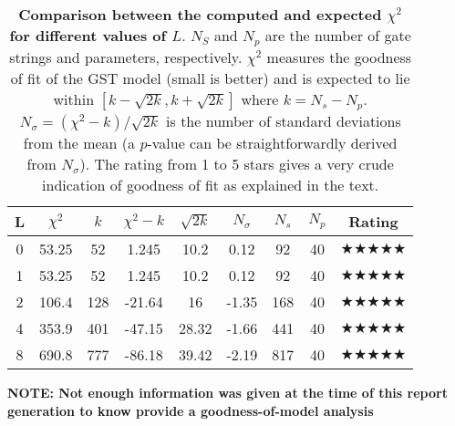 \documentclass{article}[11pt]
\begin{document}
\begin{table}[h]
\begin{center}
\begin{tabular}[l]{|c|c|c|c|c|c|c|c|c|}
\hline
L & $\chi^2$ & $k$ & $\chi^2-k$ & $\sqrt{2k}$ & $N_\sigma$ & $N_s$ & $N_p$ & Rating \\ \hline
0 & 53.25 & 52 & 1.245 & 10.2 & 0.12 & 92 & 40 & $\bigstar\bigstar\bigstar\bigstar\bigstar$ \\ \hline
1 & 53.25 & 52 & 1.245 & 10.2 & 0.12 & 92 & 40 & $\bigstar\bigstar\bigstar\bigstar\bigstar$ \\ \hline
2 & 106.4 & 128 & -21.64 & 16 & -1.35 & 168 & 40 & $\bigstar\bigstar\bigstar\bigstar\bigstar$ \\ \hline
4 & 353.9 & 401 & -47.15 & 28.32 & -1.66 & 441 & 40 & $\bigstar\bigstar\bigstar\bigstar\bigstar$ \\ \hline
8 & 690.8 & 777 & -86.18 & 39.42 & -2.19 & 817 & 40 & $\bigstar\bigstar\bigstar\bigstar\bigstar$ \\ \hline
\end{tabular}

\caption{\textbf{Comparison between the computed and expected $\chi^2$ for different values of $L$}.  $N_S$ and $N_p$ are the number of gate strings and parameters, respectively.  $\chi^2$ measures the goodness of fit of the GST model (small is better) and is expected to lie within $[k-\sqrt{2k},k+\sqrt{2k}]$ where $k = N_s-N_p$. $N_\sigma = (\chi^2-k)/\sqrt{2k}$ is the number of standard deviations from the mean (a $p$-value can be straightforwardly derived from $N_\sigma$). The rating from 1 to 5 stars gives a very crude indication of goodness of fit as explained in the text.\label{progressTable}}
\end{center}
\end{table}

{
\textbf{NOTE: Not enough information was given at the time of this report generation to know provide a goodness-of-model analysis}
}

\FloatBarrier
\end{document}
